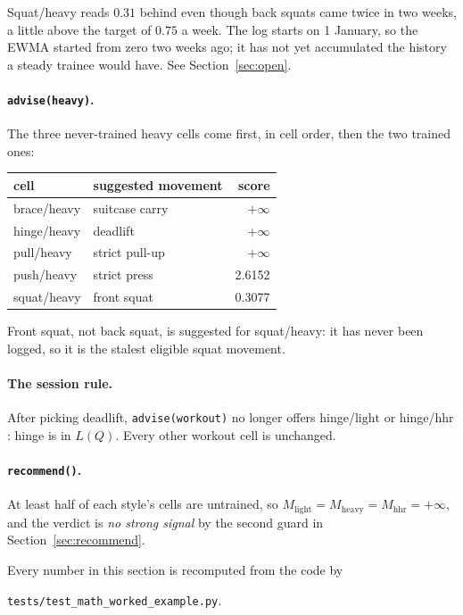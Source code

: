\documentclass[11pt]{article}
\theoremstyle{plain}
\theoremstyle{definition}
\newcommand{\code}[1]{\texttt{#1}}
\newcommand{\light}{\mathrm{light}}
\newcommand{\heavy}{\mathrm{heavy}}
\newcommand{\hhr}{\mathrm{hhr}}
\begin{document}
Squat/heavy reads $0.31$ behind even though back squats came twice in two
weeks, a little above the target of $0.75$ a week. The log starts on
1 January, so the EWMA started from zero two weeks ago; it has not yet
accumulated the history a steady trainee would have. See
Section~\ref{sec:open}.

\paragraph{\code{advise(heavy)}.} The three never-trained heavy cells come
first, in cell order, then the two trained ones:

\begin{center}
\begin{tabular}{llr}
\toprule
cell & suggested movement & score \\
\midrule
brace/heavy & suitcase carry & $+\infty$ \\
hinge/heavy & deadlift       & $+\infty$ \\
pull/heavy  & strict pull-up & $+\infty$ \\
push/heavy  & strict press   & 2.6152 \\
squat/heavy & front squat    & 0.3077 \\
\bottomrule
\end{tabular}
\end{center}

Front squat, not back squat, is suggested for squat/heavy: it has never
been logged, so it is the stalest eligible squat movement.

\paragraph{The session rule.} After picking deadlift,
\code{advise(workout)} no longer offers hinge/$\light$ or hinge/$\hhr$:
hinge is in $L(Q)$. Every other workout cell is unchanged.

\paragraph{\code{recommend()}.} At least half of each style's cells are
untrained, so $M_\light = M_\heavy = M_\hhr = +\infty$, and the verdict is
\emph{no strong signal} by the second guard in
Section~\ref{sec:recommend}.

Every number in this section is recomputed from the code by
\begin{center}
\code{tests/test\_math\_worked\_example.py}.
\end{center}
\end{document}
